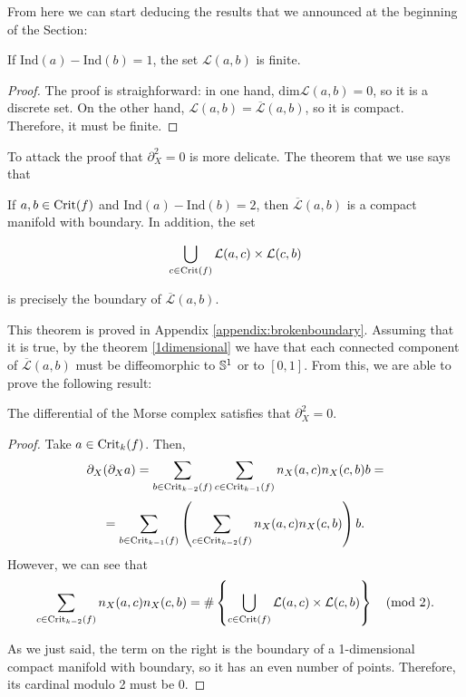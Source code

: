 From here we can start deducing the results that we announced at the beginning of the Section:

\begin{coro}
If $\text{Ind}(a)-\text{Ind}(b) = 1$, the set $\mathcal{L}(a,b)$ is finite.
\end{coro}

\begin{proof}
The proof is straighforward: in one hand, $\text{dim} \mathcal{L}(a,b) = 0$, so it is a discrete set. On the other hand, $\mathcal{L}(a,b) = \overline{\mathcal{L}}(a,b)$, so it is compact. Therefore, it must be finite.
\end{proof}

To attack the proof that $\partial_X^2 = 0$ is more delicate.
The theorem that we use says that

\begin{theo} \label{morse_brokenboundary}
If $a, b \in \text{Crit}(f)$ and $\text{Ind}(a)-\text{Ind}(b) = 2$, then $\overline{\mathcal{L}}(a,b)$ is a compact manifold with boundary. In addition, the set

$$\bigcup_{c \in \text{Crit}(f)} \mathcal{L}(a,c) \times \mathcal{L}(c,b)$$

is precisely the boundary of $\overline{\mathcal{L}}(a,b)$.
\end{theo}

This theorem is proved in Appendix \ref{appendix:brokenboundary}. Assuming that it is true, by the theorem \ref{1dimensional} we have that each connected component of $\overline{\mathcal{L}}(a,b)$ must be diffeomorphic to $\mathbb{S}^1$ or to $[0,1]$. From this, we are able to prove the following result:

\begin{coro} The differential of the Morse complex satisfies that $\partial_X^2 = 0$.
\end{coro}

\begin{proof}
Take $a \in \text{Crit}_k(f)$. Then,
$$\partial_X (\partial_X a) = \sum_{b \in \text{Crit}_{k-2}(f)} \sum_{c \in \text{Crit}_{k-1}(f)} n_X(a,c) n_X(c,b) b =$$
$$= \sum_{b \in \text{Crit}_{k-1}(f)} \left( \sum_{c \in \text{Crit}_{k-2}(f)} n_X(a,c) n_X(c,b) \right) b .$$
However, we can see that
$$\sum_{c \in \text{Crit}_{k-2}(f)} n_X(a,c) n_X(c,b) = \# \left\{ \bigcup_{c \in \text{Crit}(f)} \mathcal{L}(a,c) \times \mathcal{L}(c,b) \right\} \quad (\text{mod } 2).$$

As we just said, the term on the right is the boundary of a 1-dimensional compact manifold with boundary, so it has an even number of points. Therefore, its cardinal modulo 2 must be 0.
\end{proof}
